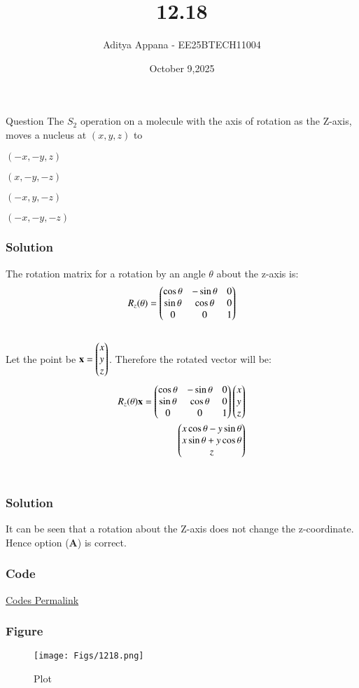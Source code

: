 \documentclass{beamer}
\title %
{12.18}
\date{October 9,2025}
\author %
{Aditya Appana - EE25BTECH11004}
\begin{document}
\frame{\titlepage}
\begin{frame}{Question}
The $S_2$ operation on a molecule with the axis of rotation as the Z-axis, moves a nucleus at $(x,y,z)$ to
\begin{enumerate}
\begin{multicols}{4}
    \item $(-x,-y,z)$
    \item $(x,-y,-z)$
    \item $(-x,y,-z)$
    \item $(-x,-y,-z)$
\end{multicols}
\end{enumerate}
\end{frame}



\begin{frame}[fragile]
    \frametitle{Solution}
The rotation matrix for a rotation by an angle $\theta$ about the z-axis is:
\begin{align}
R_z(\theta) = \begin{pmatrix}
\cos\theta & -\sin\theta & 0 \\
\sin\theta & \cos\theta & 0 \\
0 & 0 & 1\end{pmatrix}
\end{align}\\
Let the point be $\mathbf{x} = \begin{pmatrix}x\\y\\z\end{pmatrix}$. Therefore the rotated vector will be:
\begin{align}
 R_z(\theta)\mathbf{x} =
 \begin{pmatrix}\cos\theta & -\sin\theta & 0 \\\sin\theta & \cos\theta & 0 \\0 & 0 & 1\end{pmatrix}\begin{pmatrix}x\\y\\z\end{pmatrix}\\
 \begin{pmatrix}x\cos\theta - y\sin\theta \\ x\sin\theta +y\cos\theta \\ z\end{pmatrix}
\end{align}\\

\end{frame}
\begin{frame}[fragile]
    \frametitle{Solution}
It can be seen that a rotation about the Z-axis does not change the z-coordinate. Hence option (\textbf{A}) is correct.
\end{frame}


\begin{frame}[fragile]
    \frametitle{Code}
\href{https://github.com/AdityaAppana/ee1030-2025/tree/7296aff407ab736741f448272403a443c5153f2e/ee25btech11004/matgeo/12.122/Codes}{Codes Permalink}
\end{frame}

\begin{frame}[fragile]
    \frametitle{Figure}
\begin{figure}[H]
    \centering
    \texttt{[image: Figs/1218.png]}
    \caption{Plot}
    \label{fig:placeholder}
\end{figure}
\end{frame}
\end{document}
